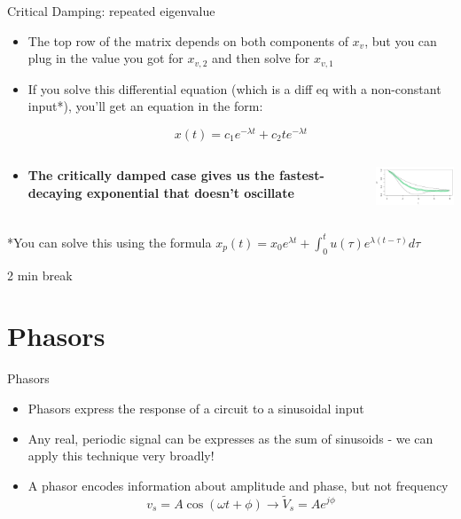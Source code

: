 \documentclass{beamer}
\begin{document}
	\begin{frame}{Critical Damping: repeated eigenvalue}
	    \begin{itemize}
	        \item The top row of the matrix depends on both components of $x_v$, but you can plug in the value you got for $x_{v,2}$ and then solve for $x_{v,1}$
            
            \item If you solve this differential equation (which is a diff eq with a non-constant input*), you’ll get an equation in the form:
            
            $$x(t) = c_1e^{-\lambda{t}} + c_2te^{-\lambda{t}}$$
            
            \item
            \begin{columns}[onlytextwidth,T]
            \column{\dimexpr\linewidth-40mm-5mm}
        	    \textbf{The critically damped case gives us the fastest-decaying exponential that doesn’t oscillate}
        	
        	\column{40mm}
        	    \includegraphics[width=40mm]{eigenvalue-types-4.png}
    	    \end{columns}
	    \end{itemize}
	    
	    *You can solve this using the formula $x_p(t) = x_0e^{\lambda{t}} + \int_0^t u(\tau)e^{\lambda(t-\tau)} d\tau$
	\end{frame}
	
	\begin{frame}
	    2 min break
	\end{frame}
	
	\section{Phasors}
	
    \begin{frame}{Phasors}
        \begin{itemize}
            \item Phasors express the response of a circuit to a sinusoidal input
            \item Any real, periodic signal can be expresses as the sum of sinusoids - we can apply this technique very broadly!
            \item A phasor encodes information about amplitude and phase, but not frequency
            $$v_s=A\cos(\omega t+\phi) \rightarrow \tilde{V}_s=Ae^{j\phi}$$
        \end{itemize}
    \end{frame}
    
\end{document}
